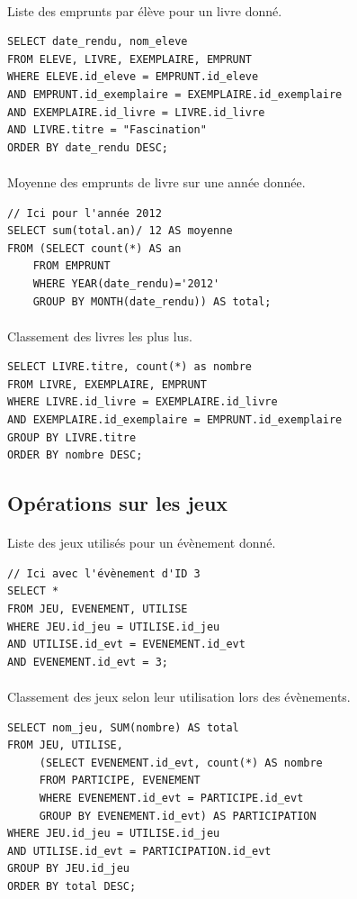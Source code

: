 \documentclass[a4paper, 11pt]{article}
\begin{document}
\paragraph{}
Liste des emprunts par élève pour un livre donné.
\begin{verbatim}
SELECT date_rendu, nom_eleve  
FROM ELEVE, LIVRE, EXEMPLAIRE, EMPRUNT  
WHERE ELEVE.id_eleve = EMPRUNT.id_eleve  
AND EMPRUNT.id_exemplaire = EXEMPLAIRE.id_exemplaire  
AND EXEMPLAIRE.id_livre = LIVRE.id_livre  
AND LIVRE.titre = "Fascination" 
ORDER BY date_rendu DESC;
\end{verbatim}
\paragraph{}
Moyenne des emprunts de livre sur une année donnée.
\begin{verbatim}
// Ici pour l'année 2012
SELECT sum(total.an)/ 12 AS moyenne 
FROM (SELECT count(*) AS an 
    FROM EMPRUNT 
    WHERE YEAR(date_rendu)='2012' 
    GROUP BY MONTH(date_rendu)) AS total;
\end{verbatim}
\paragraph{}
Classement des livres les plus lus.
\begin{verbatim}
SELECT LIVRE.titre, count(*) as nombre 
FROM LIVRE, EXEMPLAIRE, EMPRUNT 
WHERE LIVRE.id_livre = EXEMPLAIRE.id_livre 
AND EXEMPLAIRE.id_exemplaire = EMPRUNT.id_exemplaire 
GROUP BY LIVRE.titre 
ORDER BY nombre DESC;
\end{verbatim}
\subsection{Opérations sur les jeux}
\paragraph{}
Liste des jeux utilisés pour un évènement donné.
\begin{verbatim}
// Ici avec l'évènement d'ID 3
SELECT *
FROM JEU, EVENEMENT, UTILISE
WHERE JEU.id_jeu = UTILISE.id_jeu
AND UTILISE.id_evt = EVENEMENT.id_evt
AND EVENEMENT.id_evt = 3;
\end{verbatim}
\paragraph{}
Classement des jeux selon leur utilisation lors des évènements.
\begin{verbatim}
SELECT nom_jeu, SUM(nombre) AS total
FROM JEU, UTILISE, 
     (SELECT EVENEMENT.id_evt, count(*) AS nombre 
     FROM PARTICIPE, EVENEMENT 
     WHERE EVENEMENT.id_evt = PARTICIPE.id_evt 
     GROUP BY EVENEMENT.id_evt) AS PARTICIPATION
WHERE JEU.id_jeu = UTILISE.id_jeu
AND UTILISE.id_evt = PARTICIPATION.id_evt
GROUP BY JEU.id_jeu
ORDER BY total DESC;
\end{verbatim}
\end{document}
